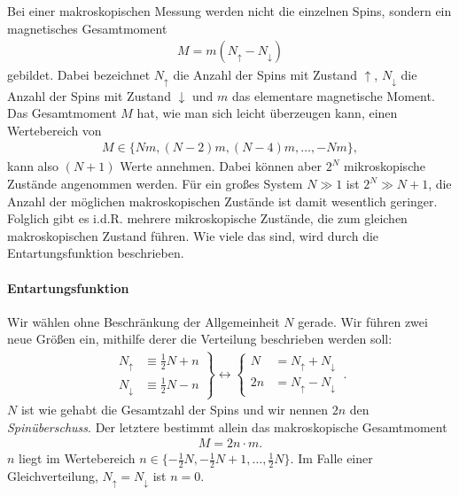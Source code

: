 Bei einer makroskopischen Messung werden nicht die einzelnen Spins, sondern ein magnetisches Gesamtmoment
\begin{align*}
    M=m(N_\uparrow-N_\downarrow)
\end{align*}
gebildet. Dabei bezeichnet $N_\uparrow$ die Anzahl der Spins mit Zustand $\uparrow$, $N_\downarrow$ die Anzahl der Spins mit Zustand $\downarrow$ und $m$ das elementare magnetische Moment. Das Gesamtmoment $M$ hat, wie man sich leicht überzeugen kann, einen Wertebereich von
\begin{align*}
    M\in\{Nm,(N-2)m,(N-4)m,\ldots ,-Nm\},
\end{align*}
kann also $(N+1)$ Werte annehmen. Dabei können aber $2^N$ mikroskopische Zustände angenommen werden. Für ein großes System $N \gg 1$ ist $2^N \gg N+1$, die Anzahl der möglichen makroskopischen Zustände ist damit wesentlich geringer. Folglich gibt es i.d.R. mehrere mikroskopische Zustände, die zum gleichen makroskopischen Zustand führen. Wie viele das sind, wird durch die Entartungsfunktion beschrieben.


\paragraph*{Entartungsfunktion}

Wir wählen ohne Beschränkung der Allgemeinheit $N$ gerade. Wir führen zwei neue Größen ein, mithilfe derer die Verteilung beschrieben werden soll:
\begin{align*}
    \left.
    \begin{aligned}
        N_\uparrow   & \equiv \frac{1}{2} N+n \\
        N_\downarrow & \equiv \frac{1}{2}N-n
    \end{aligned}
    \right\} \leftrightarrow
    \left\{
    \begin{aligned}
        N  & = N_\uparrow + N_\downarrow \\
        2n & = N_\uparrow-N_\downarrow
    \end{aligned}
    \right. \:.
\end{align*}
$N$ ist wie gehabt die Gesamtzahl der Spins und wir nennen $2n$ den \emph{Spinüberschuss}. Der letztere bestimmt allein das makroskopische Gesamtmoment
\begin{align*}
    M=2n\cdot m.
\end{align*}
$n$ liegt im Wertebereich $n\in\{-\frac{1}{2}N,-\frac{1}{2}N+1,\dots,\frac{1}{2}N\}$. Im Falle einer Gleichverteilung, $N_\uparrow=N_\downarrow$ ist $n=0$.

